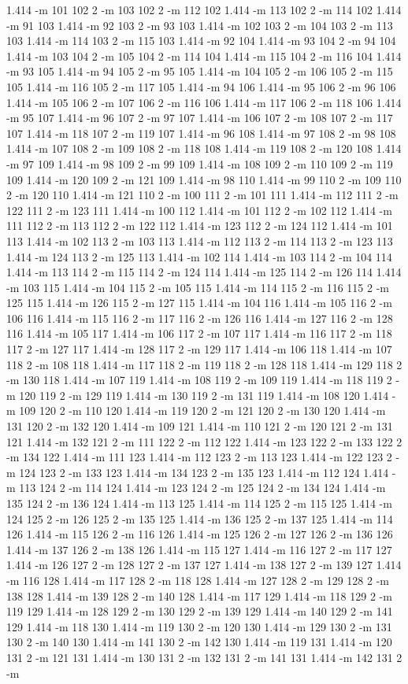 \documentclass[12pt]{article}
\begin{document}
1.414 -m 101 102 2 -m 103 102 2 -m 112 102 1.414 -m 113 102 2 -m 114 102 1.414 -m 91 103 1.414 -m 92 103 2 -m 93 103 1.414 -m 102 103 2 -m 104 103 2 -m 113 103 1.414 -m 114 103 2 -m 115 103 1.414 -m 92 104 1.414 -m 93 104 2 -m 94 104 1.414 -m 103 104 2 -m 105 104 2 -m 114 104 1.414 -m 115 104 2 -m 116 104 1.414 -m 93 105 1.414 -m 94 105 2 -m 95 105 1.414 -m 104 105 2 -m 106 105 2 -m 115 105 1.414 -m 116 105 2 -m 117 105 1.414 -m 94 106 1.414 -m 95 106 2 -m 96 106 1.414 -m 105 106 2 -m 107 106 2 -m 116 106 1.414 -m 117 106 2 -m 118 106 1.414 -m 95 107 1.414 -m 96 107 2 -m 97 107 1.414 -m 106 107 2 -m 108 107 2 -m 117 107 1.414 -m 118 107 2 -m 119 107 1.414 -m 96 108 1.414 -m 97 108 2 -m 98 108 1.414 -m 107 108 2 -m 109 108 2 -m 118 108 1.414 -m 119 108 2 -m 120 108 1.414 -m 97 109 1.414 -m 98 109 2 -m 99 109 1.414 -m 108 109 2 -m 110 109 2 -m 119 109 1.414 -m 120 109 2 -m 121 109 1.414 -m 98 110 1.414 -m 99 110 2 -m 109 110 2 -m 120 110 1.414 -m 121 110 2 -m 100 111 2 -m 101 111 1.414 -m 112 111 2 -m 122 111 2 -m 123 111 1.414 -m 100 112 1.414 -m 101 112 2 -m 102 112 1.414 -m 111 112 2 -m 113 112 2 -m 122 112 1.414 -m 123 112 2 -m 124 112 1.414 -m 101 113 1.414 -m 102 113 2 -m 103 113 1.414 -m 112 113 2 -m 114 113 2 -m 123 113 1.414 -m 124 113 2 -m 125 113 1.414 -m 102 114 1.414 -m 103 114 2 -m 104 114 1.414 -m 113 114 2 -m 115 114 2 -m 124 114 1.414 -m 125 114 2 -m 126 114 1.414 -m 103 115 1.414 -m 104 115 2 -m 105 115 1.414 -m 114 115 2 -m 116 115 2 -m 125 115 1.414 -m 126 115 2 -m 127 115 1.414 -m 104 116 1.414 -m 105 116 2 -m 106 116 1.414 -m 115 116 2 -m 117 116 2 -m 126 116 1.414 -m 127 116 2 -m 128 116 1.414 -m 105 117 1.414 -m 106 117 2 -m 107 117 1.414 -m 116 117 2 -m 118 117 2 -m 127 117 1.414 -m 128 117 2 -m 129 117 1.414 -m 106 118 1.414 -m 107 118 2 -m 108 118 1.414 -m 117 118 2 -m 119 118 2 -m 128 118 1.414 -m 129 118 2 -m 130 118 1.414 -m 107 119 1.414 -m 108 119 2 -m 109 119 1.414 -m 118 119 2 -m 120 119 2 -m 129 119 1.414 -m 130 119 2 -m 131 119 1.414 -m 108 120 1.414 -m 109 120 2 -m 110 120 1.414 -m 119 120 2 -m 121 120 2 -m 130 120 1.414 -m 131 120 2 -m 132 120 1.414 -m 109 121 1.414 -m 110 121 2 -m 120 121 2 -m 131 121 1.414 -m 132 121 2 -m 111 122 2 -m 112 122 1.414 -m 123 122 2 -m 133 122 2 -m 134 122 1.414 -m 111 123 1.414 -m 112 123 2 -m 113 123 1.414 -m 122 123 2 -m 124 123 2 -m 133 123 1.414 -m 134 123 2 -m 135 123 1.414 -m 112 124 1.414 -m 113 124 2 -m 114 124 1.414 -m 123 124 2 -m 125 124 2 -m 134 124 1.414 -m 135 124 2 -m 136 124 1.414 -m 113 125 1.414 -m 114 125 2 -m 115 125 1.414 -m 124 125 2 -m 126 125 2 -m 135 125 1.414 -m 136 125 2 -m 137 125 1.414 -m 114 126 1.414 -m 115 126 2 -m 116 126 1.414 -m 125 126 2 -m 127 126 2 -m 136 126 1.414 -m 137 126 2 -m 138 126 1.414 -m 115 127 1.414 -m 116 127 2 -m 117 127 1.414 -m 126 127 2 -m 128 127 2 -m 137 127 1.414 -m 138 127 2 -m 139 127 1.414 -m 116 128 1.414 -m 117 128 2 -m 118 128 1.414 -m 127 128 2 -m 129 128 2 -m 138 128 1.414 -m 139 128 2 -m 140 128 1.414 -m 117 129 1.414 -m 118 129 2 -m 119 129 1.414 -m 128 129 2 -m 130 129 2 -m 139 129 1.414 -m 140 129 2 -m 141 129 1.414 -m 118 130 1.414 -m 119 130 2 -m 120 130 1.414 -m 129 130 2 -m 131 130 2 -m 140 130 1.414 -m 141 130 2 -m 142 130 1.414 -m 119 131 1.414 -m 120 131 2 -m 121 131 1.414 -m 130 131 2 -m 132 131 2 -m 141 131 1.414 -m 142 131 2 -m 
\end{document}

